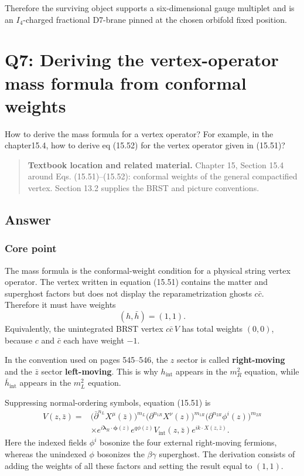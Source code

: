 \documentclass[
  10pt,
  a4paper,
  openany]{book}
\begin{document}
Therefore the surviving object supports a six-dimensional gauge
multiplet and is an \(I_4\)-charged fractional D7-brane pinned at the
chosen orbifold fixed position.

\section{Q7: Deriving the vertex-operator mass formula from conformal
weights}\label{q7-deriving-the-vertex-operator-mass-formula-from-conformal-weights}

How to derive the mass formula for a vertex operator? For example, in
the chapter15.4, how to derive eq (15.52) for the vertex operator given
in (15.51)?

\begin{quote}
\textbf{Textbook location and related material.} Chapter 15, Section
15.4 around Eqs. (15.51)--(15.52): conformal weights of the general
compactified vertex. Section 13.2 supplies the BRST and picture
conventions.
\end{quote}

\subsection{Answer}\label{answer-27}

\subsubsection{Core point}\label{core-point-27}

The mass formula is the conformal-weight condition for a physical string
vertex operator. The vertex written in equation (15.51) contains the
matter and superghost factors but does not display the reparametrization
ghosts \(c\bar c\). Therefore it must have weights \[
(h,\bar h)=(1,1).
\] Equivalently, the unintegrated BRST vertex \(c\bar c\,V\) has total
weights \((0,0)\), because \(c\) and \(\bar c\) each have weight \(-1\).

In the convention used on pages 545--546, the \(z\) sector is called
\textbf{right-moving} and the \(\bar z\) sector \textbf{left-moving}.
This is why \(h_{\mathrm{int}}\) appears in the \(m_R^2\) equation,
while \(\bar h_{\mathrm{int}}\) appears in the \(m_L^2\) equation.

Suppressing normal-ordering symbols, equation (15.51) is \[
\begin{aligned}
V(z,\bar z)
={}&
\bigl(\bar\partial^{n_L}X^\mu(\bar z)\bigr)^{m_L}
\bigl(\partial^{n_{1R}}X^\nu(z)\bigr)^{m_{1R}}
\bigl(\partial^{n_{2R}}\phi^i(z)\bigr)^{m_{2R}}
\\
&\times
e^{i\boldsymbol\lambda_R\cdot\boldsymbol\phi(z)}
e^{q\phi(z)}
V_{\mathrm{int}}(z,\bar z)
e^{ik\cdot X(z,\bar z)}.
\end{aligned}
\] Here the indexed fields \(\phi^i\) bosonize the four external
right-moving fermions, whereas the unindexed \(\phi\) bosonizes the
\(\beta\gamma\) superghost. The derivation consists of adding the
weights of all these factors and setting the result equal to \((1,1)\).
\end{document}

